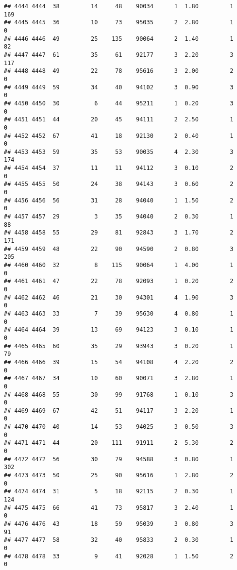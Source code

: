 \documentclass[
]{article}
\begin{document}
\begin{verbatim}
## 4444 4444  38         14     48    90034      1  1.80         1      169
## 4445 4445  36         10     73    95035      2  2.80         1        0
## 4446 4446  49         25    135    90064      2  1.40         1       82
## 4447 4447  61         35     61    92177      3  2.20         3      117
## 4448 4448  49         22     78    95616      3  2.00         2        0
## 4449 4449  59         34     40    94102      3  0.90         3        0
## 4450 4450  30          6     44    95211      1  0.20         3        0
## 4451 4451  44         20     45    94111      2  2.50         1        0
## 4452 4452  67         41     18    92130      2  0.40         1        0
## 4453 4453  59         35     53    90035      4  2.30         3      174
## 4454 4454  37         11     11    94112      3  0.10         2        0
## 4455 4455  50         24     38    94143      3  0.60         2        0
## 4456 4456  56         31     28    94040      1  1.50         2        0
## 4457 4457  29          3     35    94040      2  0.30         1       88
## 4458 4458  55         29     81    92843      3  1.70         2      171
## 4459 4459  48         22     90    94590      2  0.80         3      205
## 4460 4460  32          8    115    90064      1  4.00         1        0
## 4461 4461  47         22     78    92093      1  0.20         2        0
## 4462 4462  46         21     30    94301      4  1.90         3        0
## 4463 4463  33          7     39    95630      4  0.80         1        0
## 4464 4464  39         13     69    94123      3  0.10         1        0
## 4465 4465  60         35     29    93943      3  0.20         1       79
## 4466 4466  39         15     54    94108      4  2.20         2        0
## 4467 4467  34         10     60    90071      3  2.80         1        0
## 4468 4468  55         30     99    91768      1  0.10         3        0
## 4469 4469  67         42     51    94117      3  2.20         1        0
## 4470 4470  40         14     53    94025      3  0.50         3        0
## 4471 4471  44         20    111    91911      2  5.30         2        0
## 4472 4472  56         30     79    94588      3  0.80         1      302
## 4473 4473  50         25     90    95616      1  2.80         2        0
## 4474 4474  31          5     18    92115      2  0.30         1      124
## 4475 4475  66         41     73    95817      3  2.40         1        0
## 4476 4476  43         18     59    95039      3  0.80         3       91
## 4477 4477  58         32     40    95833      2  0.30         1        0
## 4478 4478  33          9     41    92028      1  1.50         2        0

\end{verbatim}
\end{document}
